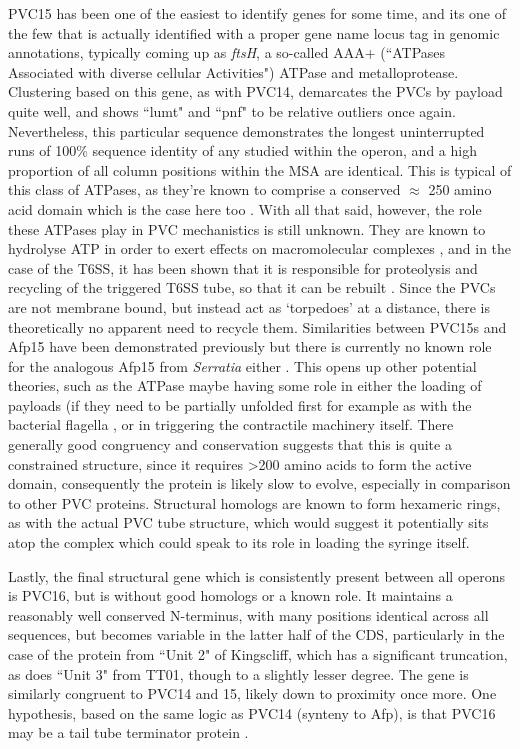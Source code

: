 PVC15 has been one of the easiest to identify genes for some time, and its one of the few that is actually identified with a proper gene name locus tag in genomic annotations, typically coming up as \emph{ftsH}, a so-called AAA+ (``ATPases Associated with diverse cellular Activities") ATPase and metalloprotease. Clustering based on this gene, as with PVC14, demarcates the PVCs by payload quite well, and shows ``lumt" and ``pnf" to be relative outliers once again. Nevertheless, this particular sequence demonstrates the longest uninterrupted runs of 100\% sequence identity of any studied within the operon, and a high proportion of all column positions within the MSA are identical. This is typical of this class of ATPases, as they're known to comprise a conserved $\approx$ 250 amino acid domain which is the case here too \citep{Hanson2005}. With all that said, however, the role these ATPases play in PVC mechanistics is still unknown. They are known to hydrolyse ATP in order to exert effects on macromolecular complexes \citep{Erzberger2006}, and in the case of the T6SS, it has been shown that it is responsible for proteolysis and recycling of the triggered T6SS tube, so that it can be rebuilt \citep{Bonemann2009, Forster2014}. Since the PVCs are not membrane bound, but instead act as `torpedoes' at a distance, there is theoretically no apparent need to recycle them. Similarities between PVC15s and Afp15 have been demonstrated previously but there is currently no known role for the analogous Afp15 from \emph{Serratia} either \citep{Hurst2004a}. This opens up other potential theories, such as the ATPase maybe having some role in either the loading of payloads (if they need to be partially unfolded first for example as with the bacterial flagella \citep{Muskotal2006}, or in triggering the contractile machinery itself. There generally good congruency and conservation suggests that this is quite a constrained structure, since it requires \textgreater 200 amino acids to form the active domain, consequently the protein is likely slow to evolve, especially in comparison to other PVC proteins. Structural homologs are known to form hexameric rings, as with the actual PVC tube structure, which would suggest it potentially sits atop the complex which could speak to its role in loading the syringe itself.

Lastly, the final structural gene which is consistently present between all operons is PVC16, but is without good homologs or a known role. It maintains a reasonably well conserved N-terminus, with many positions identical across all sequences, but becomes variable in the latter half of the CDS, particularly in the case of the protein from ``Unit 2" of Kingscliff, which has a significant truncation, as does ``Unit 3" from TT01, though to a slightly lesser degree. The gene is similarly congruent to PVC14 and 15, likely down to proximity once more. One hypothesis, based on the same logic as PVC14 (synteny to Afp), is that PVC16 may be a tail tube terminator protein \citep{Rybakova2013}.


